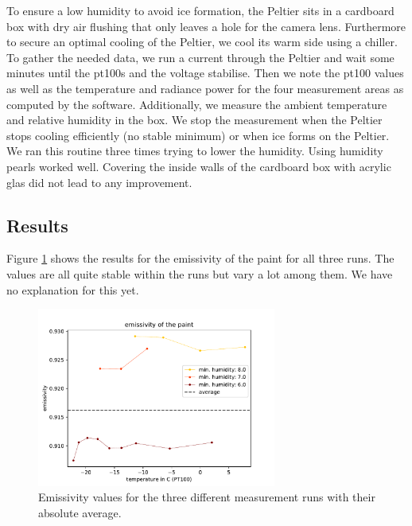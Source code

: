 To ensure a low humidity to avoid ice formation, the Peltier sits in a cardboard box with dry air flushing that only leaves a hole for the camera lens. Furthermore to secure an optimal cooling of the Peltier, we cool its warm side using a chiller. \\


To gather the needed data, we run a current through the Peltier and wait some minutes until the pt100s and the voltage stabilise. Then we note the pt100 values as well as the temperature and radiance power for the four measurement areas as computed by the software. Additionally, we measure the ambient temperature and relative humidity in the box. We stop the measurement when the Peltier stops cooling efficiently (no stable minimum) or when ice forms on the Peltier. \\


We ran this routine three times trying to lower the humidity. Using humidity pearls worked well. Covering the inside walls of the cardboard box with acrylic glas did not lead to any improvement.
\subsection{Results}
Figure \ref{fig:emissivity} shows the results for the emissivity of the paint for all three runs. The values are all quite stable within the runs but vary a lot among them. We have no explanation for this yet.
\begin{figure}[h!]
	\centering
	\includegraphics[width=0.7\textwidth]{img/emissivity.pdf}
	\caption{Emissivity values for the three different measurement runs with their absolute average.}
	\label{fig:emissivity}
\end{figure}


